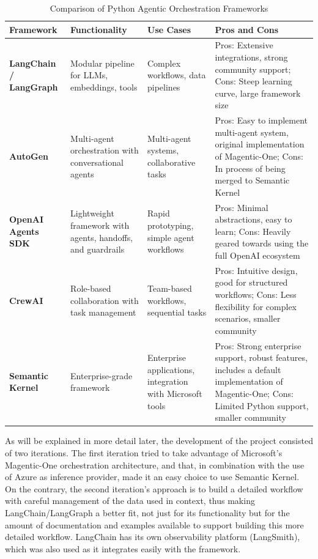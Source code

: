 \documentclass[a4paper]{report}
\begin{document}
\begin{table}[h]
\centering
\begin{tabular}{|p{3cm}|p{3cm}|p{3cm}|p{5.5cm}|}
    \hline
    \textbf{Framework} & \textbf{Functionality} & \textbf{Use Cases} & \textbf{Pros and Cons} \\ \hline
    \textbf{LangChain / LangGraph} & Modular pipeline for LLMs, embeddings, tools & Complex workflows, data pipelines & Pros: Extensive integrations, strong community support; Cons: Steep learning curve, large framework size \\ \hline
    \textbf{AutoGen} & Multi-agent orchestration with conversational agents & Multi-agent systems, collaborative tasks & Pros: Easy to implement multi-agent system, original implementation of Magentic-One; Cons: In process of being merged to Semantic Kernel \\ \hline
    \textbf{OpenAI Agents SDK} & Lightweight framework with agents, handoffs, and guardrails & Rapid prototyping, simple agent workflows & Pros: Minimal abstractions, easy to learn; Cons: Heavily geared towards using the full OpenAI ecosystem \\ \hline
    \textbf{CrewAI} & Role-based collaboration with task management & Team-based workflows, sequential tasks & Pros: Intuitive design, good for structured workflows; Cons: Less flexibility for complex scenarios, smaller community \\ \hline
    \textbf{Semantic Kernel} & Enterprise-grade framework & Enterprise applications, integration with Microsoft tools & Pros: Strong enterprise support, robust features, includes a default implementation of Magentic-One; Cons: Limited Python support, smaller community \\ \hline
\end{tabular}
\caption{Comparison of Python Agentic Orchestration Frameworks}
\label{tab:orchestration_frameworks_uses}
\end{table}

As will be explained in more detail later, the development of the project consisted of two iterations. The first iteration tried to take advantage of Microsoft's Magentic-One orchestration architecture, and that, in combination with the use of Azure as inference provider, made it an easy choice to use Semantic Kernel. On the contrary, the second iteration's approach is to build a detailed workflow with careful management of the data used in context, thus making LangChain/LangGraph a better fit, not just for its functionality but for the amount of documentation and examples available to support building this more detailed workflow. LangChain has its own observability platform (LangSmith), which was also used as it integrates easily with the framework.
\end{document}
